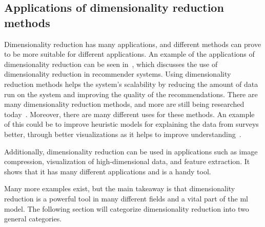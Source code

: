 \subsection{Applications of dimensionality reduction methods}

Dimensionality reduction has many applications, and different methods can prove to be more suitable for different applications. An example of the applications of dimensionality reduction can be seen in~\cite{sarwar2000application}, which discusses the use of dimensionality reduction in recommender systems. Using dimensionality reduction methods helps the system's scalability by reducing the amount of data run on the system and improving the quality of the recommendations.
There are many dimensionality reduction methods, and more are still being researched today~\cite{dimensionality-reduction-cheng}. Moreover, there are many different uses for these methods. An example of this could be to improve heuristic models for explaining the data from surveys better, through better visualizations as it helps to improve understanding~\cite{dimensionality-reduction-cheng}.

Additionally, dimensionality reduction can be used in applications such as image compression, visualization of high-dimensional data, and feature extraction. It shows that it has many different applications and is a handy tool.

Many more examples exist, but the main takeaway is that dimensionality reduction is a powerful tool in many different fields and a vital part of the \gls{ml} model. The following section will categorize dimensionality reduction into two general categories.